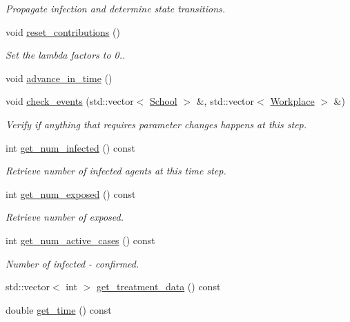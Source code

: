 \begin{DoxyCompactItemize}
\begin{DoxyCompactList}\small\item\em Propagate infection and determine state transitions. \end{DoxyCompactList}\item 
void \hyperlink{classABM_aa379d58dc83b31ad00ec57a1756fefd5}{reset\+\_\+contributions} ()
\begin{DoxyCompactList}\small\item\em Set the lambda factors to 0.. \end{DoxyCompactList}\item 
void \hyperlink{classABM_a2462506d7cedd3bde106726e99f9ced6}{advance\+\_\+in\+\_\+time} ()
\item 
void \hyperlink{classABM_a29f628a1b72cab12a2e5d6ebe7f4c6c8}{check\+\_\+events} (std\+::vector$<$ \hyperlink{classSchool}{School} $>$ \&, std\+::vector$<$ \hyperlink{classWorkplace}{Workplace} $>$ \&)
\begin{DoxyCompactList}\small\item\em Verify if anything that requires parameter changes happens at this step. \end{DoxyCompactList}\item 
int \hyperlink{classABM_a706d258fe6b07f554703d8eceeda4479}{get\+\_\+num\+\_\+infected} () const
\begin{DoxyCompactList}\small\item\em Retrieve number of infected agents at this time step. \end{DoxyCompactList}\item 
int \hyperlink{classABM_aeb5f873f0938afa13c28ff4cbfa9c07a}{get\+\_\+num\+\_\+exposed} () const
\begin{DoxyCompactList}\small\item\em Retrieve number of exposed. \end{DoxyCompactList}\item 
int \hyperlink{classABM_a90555a3d3f12fbd59449d1bd97325caf}{get\+\_\+num\+\_\+active\+\_\+cases} () const
\begin{DoxyCompactList}\small\item\em Number of infected -\/ confirmed. \end{DoxyCompactList}\item 
std\+::vector$<$ int $>$ \hyperlink{classABM_a54ff2561e36985f63ebc0020993f9a8e}{get\+\_\+treatment\+\_\+data} () const
\item 
double \hyperlink{classABM_a8a409f2ed07df42b316bcc2d4bb37340}{get\+\_\+time} () const

\end{DoxyCompactItemize}

